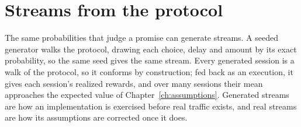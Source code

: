 \section{Streams from the protocol}

The same probabilities that judge a promise can generate streams. A seeded
generator walks the protocol, drawing each choice, delay and amount by its exact
probability, so the same seed gives the same stream. Every generated session is a
walk of the protocol, so it conforms by construction; fed back as an execution,
it gives each session's realized rewards, and over many sessions their mean
approaches the expected value of Chapter~\ref{ch:assumptions}. Generated streams
are how an implementation is exercised before real traffic exists, and real
streams are how its assumptions are corrected once it does.
